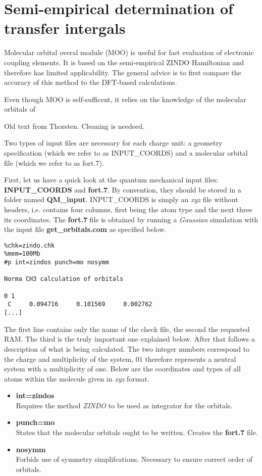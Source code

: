 \section{Semi-empirical determination of transfer intergals}
\label{sec:moo}

Molecular orbital overal module (MOO) is useful for fast evaluation of electronic coupling elements. It is based on the semi-empirical ZINDO Hamiltonian and therefore has limited applicability. The general advice is to first compare the accuracy of this method to the DFT-based calculations.  

Even though MOO is self-sufficent, it relies on the knowledge of the molecular orbitals of 

{\color{red} Old text from Thorsten. Cleaning is needeed.}

Two types of input files are necessary for each charge unit: a geometry specification (which we refer to as INPUT\_COORDS) and a molecular orbital file (which we refer to as fort.7).

First, let us have a quick look at the quantum mechanical input files: {\bf INPUT\_COORDS} and {\bf fort.7}. By convention, they should be stored in a folder named {\bf QM\_input}. INPUT\_COORDS is simply an \emph{xyz} file without headers, i.e. contains four columns, first being the atom type and the next three its coordinates. The {\bf fort.7} file is obtained by running a \emph{Gaussian} simulation with the input file {\bf get\_orbitals.com} as specified below.

\begin{verbatim}
%chk=zindo.chk
%mem=100Mb
#p int=zindos punch=mo nosymm

Norma CH3 calculation of orbitals

0 1
 C     0.094716     0.101569     0.002762
[...]
\end{verbatim}

The first line contains only the name of the check file,
the second the requested RAM. The third is the truly important
one explained below. After that follows a description of what
is being calculated. The two integer numbers correspond to the
charge and multiplicity of the system, $0 1$ therefore represents
a neutral system with a multiplicity of one. Below are the coordinates
and types of all atoms within the molecule given in \emph{xyz} format.

\begin{itemize}
 \item {\bf int=zindos} \\
        Requires the method \emph{ZINDO} to be used as integrator for the orbitals.
 \item {\bf punch=mo} \\
        States that the molecular orbitals ought to be written. Creates the {\bf fort.7} file.
 \item {\bf nosymm} \\
        Forbids use of symmetry simplifcations. Necessary to ensure correct order of orbitals.
\end{itemize}

